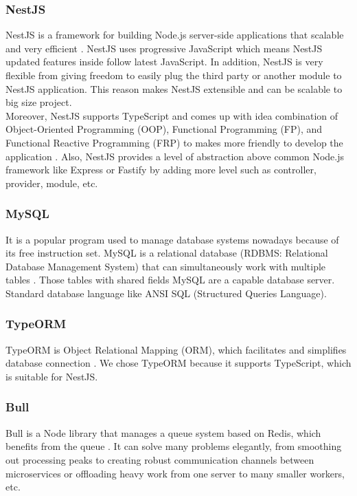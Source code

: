 \documentclass[12pt,oneside,openright,a4paper]{cpe-english-project}
\begin{document}
\subsubsection{NestJS}
NestJS is a framework for building Node.js server-side applications that scalable and very
efficient \cite{nestjs_beautiful}. NestJS uses progressive JavaScript which means NestJS updated
features inside follow latest JavaScript. In addition, NestJS is very flexible from giving
freedom to easily plug the third party or another module to NestJS application. This reason
makes NestJS extensible and can be scalable to big size project.\\
Moreover, NestJS supports TypeScript and comes up with idea combination of Object-Oriented
Programming (OOP), Functional Programming (FP), and Functional Reactive Programming (FRP)
to makes more friendly to develop the application \cite{nestjs_beautiful}. Also, NestJS
provides a level of abstraction above common Node.js framework like Express or
Fastify by adding more level such as controller, provider, module, etc.

\subsubsection{MySQL}
It is a popular program used to manage database systems nowadays because of its free instruction
set. MySQL is a relational database (RDBMS: Relational Database Management System) that can
simultaneously work with multiple tables \cite{what_is_mysql}. Those tables with shared fields
MySQL are a capable database server. Standard database language like ANSI SQL
(Structured Queries Language).

\subsubsection{TypeORM}
TypeORM is Object Relational Mapping (ORM), which facilitates and simplifies database connection \cite{typeorm}.
We chose TypeORM because it supports TypeScript, which is suitable for NestJS.

\subsubsection{Bull}
Bull is a Node library that manages a queue system based on Redis, which benefits from the queue
\cite{job_queue_management_bull}. It can solve many problems elegantly, from smoothing out processing peaks to creating
robust communication channels between microservices or offloading heavy work from one server to
many smaller workers, etc.
\end{document}
